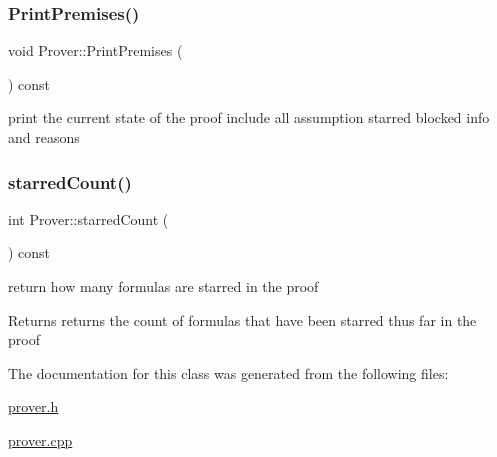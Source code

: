 \subsubsection{\texorpdfstring{Print\+Premises()}{PrintPremises()}}
{\footnotesize\ttfamily void Prover\+::\+Print\+Premises (\begin{DoxyParamCaption}{ }\end{DoxyParamCaption}) const}

print the current state of the proof include all assumption starred blocked info and reasons \mbox{\label{classProver_a21743acd96dd9b8bf26ee02ea8761d88}} 
\subsubsection{\texorpdfstring{starred\+Count()}{starredCount()}}
{\footnotesize\ttfamily int Prover\+::starred\+Count (\begin{DoxyParamCaption}{ }\end{DoxyParamCaption}) const}

return how many formulas are starred in the proof \begin{DoxyReturn}{Returns}
returns the count of formulas that have been starred thus far in the proof 
\end{DoxyReturn}


The documentation for this class was generated from the following files\+:\begin{DoxyCompactItemize}
\item 
\mbox{\hyperlink{prover_8h}{prover.\+h}}\item 
\mbox{\hyperlink{prover_8cpp}{prover.\+cpp}}\end{DoxyCompactItemize}
